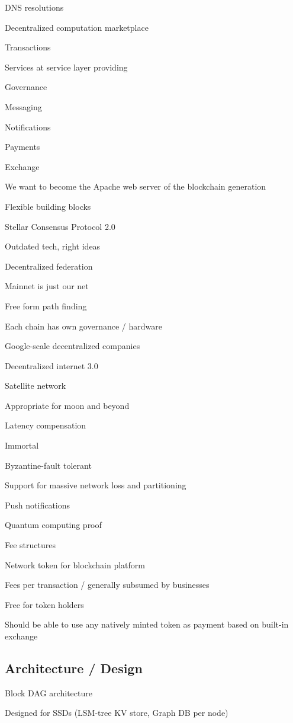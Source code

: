 \documentclass[11pt]{article}
\begin{document}
DNS resolutions


Decentralized computation marketplace


Transactions


Services at service layer providing


Governance


Messaging


Notifications


Payments


Exchange


We want to become the Apache web server of the blockchain generation


Flexible building blocks


Stellar Consensus Protocol 2.0


Outdated tech, right ideas


Decentralized federation


Mainnet is just our net


Free form path finding


Each chain has own governance / hardware


Google-scale decentralized companies


Decentralized internet 3.0


Satellite network


Appropriate for moon and beyond


Latency compensation


Immortal


Byzantine-fault tolerant


Support for massive network loss and partitioning


Push notifications


Quantum computing proof


Fee structures


Network token for blockchain platform


Fees per transaction / generally subsumed by businesses


Free for token holders


Should be able to use any natively minted token as payment based on built-in exchange


\subsection{Architecture / Design}

Block DAG architecture


Designed for SSDs (LSM-tree KV store, Graph DB per node)
\end{document}
